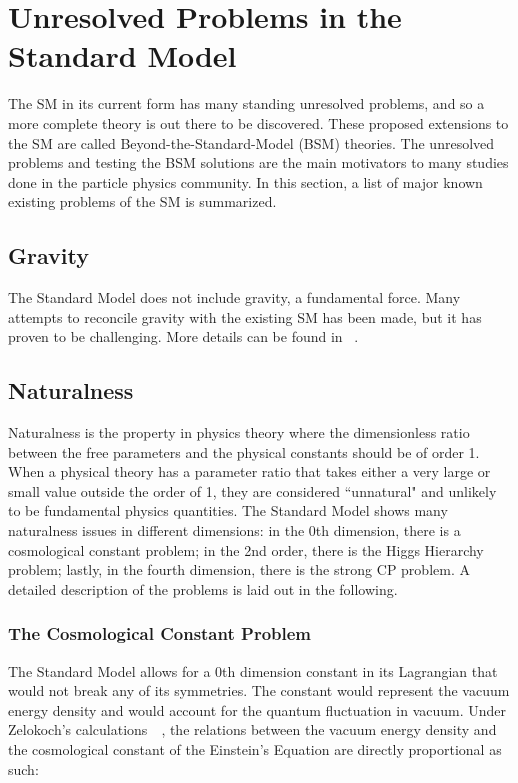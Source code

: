 \section{Unresolved Problems in the Standard Model}
\label{sec:UnresolvedSM}
The SM in its current form has many standing unresolved problems, and so a more complete theory is out there to be discovered. These proposed extensions to the SM are called Beyond-the-Standard-Model (BSM) theories. The unresolved problems and testing the BSM solutions are the main motivators to many studies done in the particle physics community. In this section, a list of major known existing problems of the SM is summarized.

\subsection{Gravity}
The Standard Model does not include gravity, a fundamental force. Many attempts to reconcile gravity with the existing SM has been made, but it has proven to be challenging. More details can be found in ~\cite{sep-quantum-gravity}.

\subsection{Naturalness}
Naturalness is the property in physics theory where the dimensionless ratio between the free parameters and the physical constants should be of order 1. When a physical theory has a parameter ratio that takes either a very large or small value outside the order of 1, they are considered ``unnatural" and unlikely to be fundamental physics quantities. The Standard Model shows many naturalness issues in different dimensions: in the 0th dimension, there is a cosmological constant problem; in the 2nd order, there is the Higgs Hierarchy problem; lastly, in the fourth dimension, there is the strong CP problem. A detailed description of the problems is laid out in the following.

\subsubsection{The Cosmological Constant Problem}
The Standard Model allows for a 0th dimension constant in its Lagrangian that would not break any of its symmetries. The constant would represent the vacuum energy density and would account for the quantum fluctuation in vacuum. Under Zelokoch's calculations~~\cite{zel1968cosmological}, the relations between the vacuum energy density and the cosmological constant of the Einstein's Equation are directly proportional as such:

